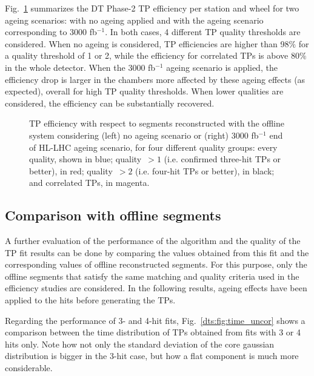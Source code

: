 \documentclass[../main.tex]{subfiles}
\begin{document}
Fig.~\ref{dts:fig:efficiency} summarizes the DT Phase-2 TP efficiency per station and wheel for two ageing scenarios: with no ageing applied and with the ageing scenario corresponding to 3000 fb${}^{-1}$. In both cases, 4 different TP quality thresholds are considered. When no ageing is considered, TP efficiencies are higher than 98$\%$ for a quality threshold of 1 or 2, while the efficiency for correlated TPs is above 80$\%$ in the whole detector. When the 3000 fb${}^{-1}$ ageing scenario is applied, the efficiency drop is larger in the chambers more affected by these ageing effects (as expected), overall for high TP quality thresholds. When lower qualities are considered, the efficiency can be substantially recovered.


\begin{figure}[h!]

\begin{center}
\end{center}
\caption[Algorithm efficiency with respect to segments]{TP efficiency with respect to segments reconstructed with the offline system considering (left) no ageing scenario or (right) 3000 fb${}^{-1}$ end of HL-LHC ageing scenario, for four different quality groups: every quality, shown in blue; quality~$>1$ (i.e. confirmed three-hit TPs or better), in red; quality~$>2$ (i.e. four-hit TPs or better), in black; and correlated TPs, in magenta.}
\label{dts:fig:efficiency}
\end{figure}


\subsection{Comparison with offline segments}

A further evaluation of the performance of the algorithm and the quality of the TP fit results can be done by comparing the values obtained from this fit and the corresponding values of offline reconstructed segments. For this purpose, only the offline segments that satisfy the same matching and quality criteria used in the efficiency studies are considered. In the following results, ageing effects have been applied to the hits before generating the TPs.

Regarding the performance of 3- and 4-hit fits, Fig.~\ref{dts:fig:time_uncor} shows a comparison between the time distribution of TPs obtained from fits with 3 or 4 hits only. Note how not only the standard deviation of the core gaussian distribution is bigger in the 3-hit case, but how a flat component is much more considerable.
\end{document}
